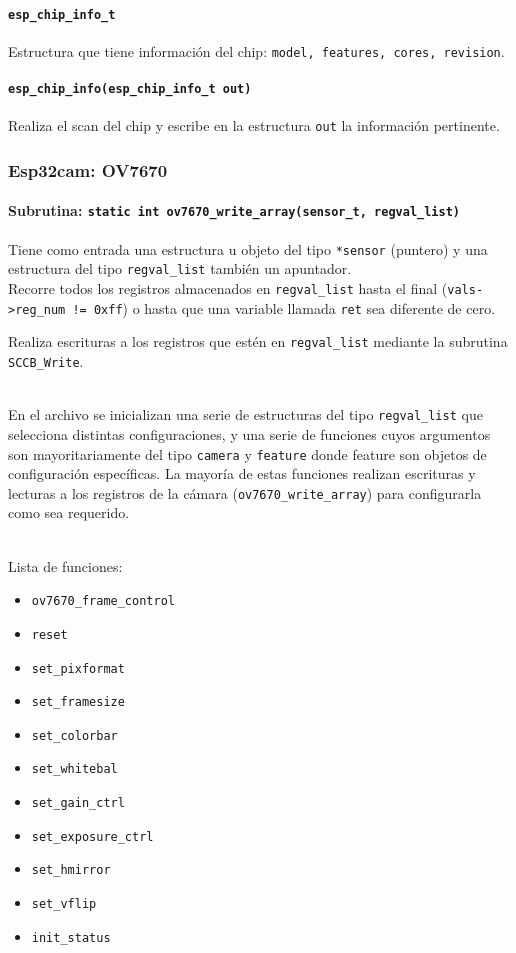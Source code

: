 \paragraph{\texttt{esp\_chip\_info\_t}}
Estructura que tiene información del chip: \texttt{model, features, cores, revision}.

\paragraph{\texttt{esp\_chip\_info(esp\_chip\_info\_t out)}}
Realiza el scan del chip y escribe en la estructura \texttt{out} la información pertinente.

\subsubsection{Esp32cam: OV7670}

\paragraph{\textbf{Subrutina}: \texttt{static int ov7670\_write\_array(sensor\_t, regval\_list)}}

Tiene como entrada una estructura u objeto del tipo \texttt{*sensor} (puntero) y una estructura del tipo
\texttt{regval\_list} también un apuntador.\\
Recorre todos los registros almacenados en \texttt{regval\_list} hasta el final (\texttt{vals->reg\_num != 0xff}) o hasta que una variable llamada \texttt{ret} sea diferente de cero.

Realiza escrituras a los registros que estén en \texttt{regval\_list} mediante la subrutina \texttt{SCCB\_Write}.\\\

En el archivo se inicializan una serie de estructuras del tipo \texttt{regval\_list} que selecciona distintas configuraciones, y una serie de funciones cuyos argumentos son mayoritariamente del tipo \texttt{camera} y \texttt{feature} donde feature son objetos de configuración específicas. La mayoría de estas funciones realizan escrituras y lecturas a los registros de la cámara (\texttt{ov7670\_write\_array}) para configurarla como sea requerido.\\\

Lista de funciones:

\begin{itemize}
    \item \texttt{ov7670\_frame\_control}
    \item \texttt{reset}
    \item \texttt{set\_pixformat}
    \item \texttt{set\_framesize}
    \item \texttt{set\_colorbar}
    \item \texttt{set\_whitebal}
    \item \texttt{set\_gain\_ctrl}
    \item \texttt{set\_exposure\_ctrl}
    \item \texttt{set\_hmirror}
    \item \texttt{set\_vflip}
    \item \texttt{init\_status}
\end{itemize}

